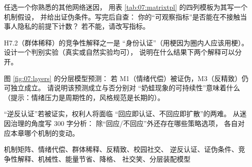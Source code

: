 \begin{nlexercises}
  \item 任选一个你熟悉的其他网络迷因，
        用表 \ref{tab:07:matrixtpl} 的四列模板为其写一个机制假设，
        并给出证伪条件。写完后自查：
        你的“可观察指标”是否能在不接触当事人隐私的前提下计数？
        若不能，请改写指标。
  \item H7.2（群体稀释）的竞争性解释之一是
        “身份认证”（用梗因为圈内人应该用梗）。
        设计一个判别实验（真实或自然实验均可），
        说明在什么结果下两个解释可以分开。
  \item 图 \ref{fig:07:layers} 的分层模型预测：
        若 M1（情绪代偿）被证伪，M3（反精致）仍可独立成立。
        请说明该预测成立与否分别对
        “奶蛙现象的可持续性”意味着什么
        （提示：情绪压力是周期性的，风格规范是长期的）。
  \item “逆反认证”若被证实，权利人将面临
        “回应即认证、不回应即扩散”的两难。
        从迷因治理的角度写 300 字分析：
        除“回应/不回应”外还存在哪些策略选项，
        各自对应本章哪个机制的变动。
\end{nlexercises}

\nlkeywords 机制矩阵、情绪代偿、群体稀释、反精致、校园社交、
逆反认证、证伪条件、竞争性解释、机械性、能量节省、降格、
社交笑、分层装配模型
